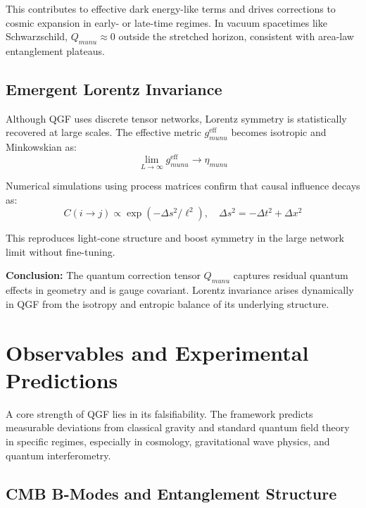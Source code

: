 \documentclass[11pt]{article}
\def\mu{mu}
\def\nu{nu}
\def\frac#1#2{#1/#2}
\def\left{}
\def\right{}
\begin{document}
This contributes to effective dark energy-like terms and drives corrections to cosmic expansion in early- or late-time regimes. In vacuum spacetimes like Schwarzschild, \( Q_{\mu\nu} \approx 0 \) outside the stretched horizon, consistent with area-law entanglement plateaus.

\subsection{Emergent Lorentz Invariance}

Although QGF uses discrete tensor networks, Lorentz symmetry is statistically recovered at large scales. The effective metric \( g_{\mu\nu}^{\text{eff}} \) becomes isotropic and Minkowskian as:
\begin{equation}
\lim_{L \to \infty} g_{\mu\nu}^{\text{eff}} \to \eta_{\mu\nu}
\end{equation}

Numerical simulations using process matrices confirm that causal influence decays as:
\begin{equation}
C(i \rightarrow j) \propto \exp\left(-\frac{\Delta s^2}{\ell^2}\right), \quad \Delta s^2 = -\Delta t^2 + \Delta x^2
\end{equation}

This reproduces light-cone structure and boost symmetry in the large network limit without fine-tuning.

\textbf{Conclusion:} The quantum correction tensor \( Q_{\mu\nu} \) captures residual quantum effects in geometry and is gauge covariant. Lorentz invariance arises dynamically in QGF from the isotropy and entropic balance of its underlying structure.



\section{Observables and Experimental Predictions}

A core strength of QGF lies in its falsifiability. The framework predicts measurable deviations from classical gravity and standard quantum field theory in specific regimes, especially in cosmology, gravitational wave physics, and quantum interferometry.

\subsection{CMB B-Modes and Entanglement Structure}
\end{document}
